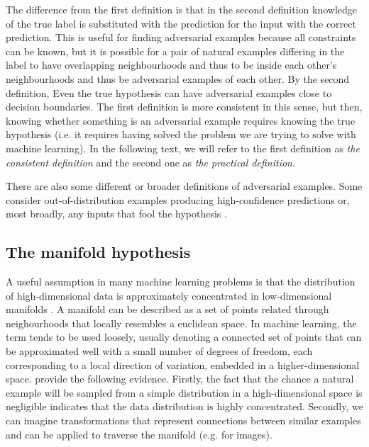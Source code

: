 \documentclass{article}
\begin{document}
The difference from the first definition is that in the second definition knowledge of the true label is substituted with the prediction for the input with the correct prediction. This is useful for finding adversarial examples because all constraints can be known, but it is possible for a pair of natural examples differing in the label to have overlapping neighbourhoods and thus to be inside each other's neighbourhoods and thus be adversarial examples of each other. By the second definition, Even the true hypothesis can have adversarial examples close to decision boundaries. The first definition is more consistent in this sense, but then, knowing whether something is an adversarial example requires knowing the true hypothesis (i.e. it requires having solved the problem we are trying to solve with machine learning). In the following text, we will refer to the first definition as \textit{the consistent definition} and the second one as \textit{the practical definition}.

There are also some different or broader definitions of adversarial examples. Some consider out-of-distribution examples producing high-confidence predictions \citep{Gal:2018:SCIMHNAETESBNN} or, most broadly, any inputs that fool the hypothesis \citep{Brown:2018:UAE}.


\subsection{The manifold hypothesis}

A useful assumption in many machine learning problems is that the distribution of high-dimensional data is approximately concentrated in low-dimensional manifolds \citep{Goodfellow:2016:DL}. A manifold can be described as a set of points related through neighourhoods that locally resembles a euclidean space. In machine learning, the term tends to be used loosely, usually denoting a connected set of points that can be approximated well with a small number of degrees of freedom, each corresponding to a local direction of variation, embedded in a higher-dimensional space. 
\citep{Goodfellow:2016:DL} provide the following evidence. Firstly, the fact that the chance a natural example will be sampled from a simple distribution in a high-dimensional space is negligible indicates that the data distribution is highly concentrated. Secondly, we can imagine transformations that represent connections between similar examples and can be applied to traverse the manifold (e.g. for images).
\end{document}
